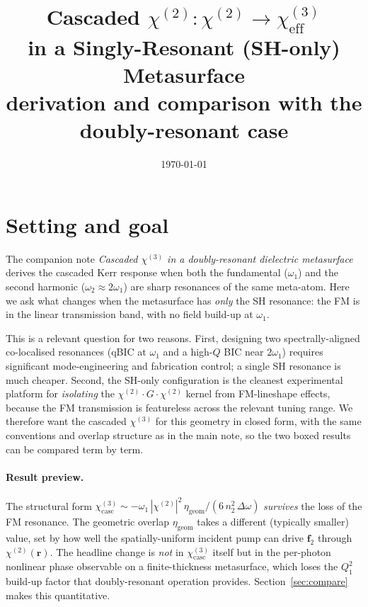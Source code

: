 \documentclass[11pt,a4paper]{article}
\newcommand{\bvec}[1]{\mathbf{#1}}
\newcommand{\f}{\bvec{f}}
\newcommand{\ri}{\bvec{r}}
\newcommand{\chitwo}{\chi^{(2)}}
\newcommand{\chithree}{\chi^{(3)}}
\newcommand{\Dom}{\Delta\omega}
\begin{document}
\title{Cascaded $\chi^{(2)}{:}\chi^{(2)} \to \chi^{(3)}_\text{eff}$\\
       in a Singly-Resonant (SH-only) Metasurface \\[2pt]
       \large derivation and comparison with the doubly-resonant case}
\author{}
\date{\today}
\maketitle

\section{Setting and goal}\label{sec:setting}

The companion note \emph{Cascaded $\chithree$ in a doubly-resonant dielectric
metasurface} derives the cascaded Kerr response when both the fundamental
($\omega_1$) and the second harmonic ($\omega_2\approx 2\omega_1$) are
sharp resonances of the same meta-atom.  Here we ask what changes when the
metasurface has \emph{only} the SH resonance: the FM is in the linear
transmission band, with no field build-up at $\omega_1$.

This is a relevant question for two reasons.  First, designing two
spectrally-aligned co-localised resonances (qBIC at $\omega_1$ and a high-$Q$
BIC near $2\omega_1$) requires significant mode-engineering and fabrication
control; a single SH resonance is much cheaper.  Second, the SH-only
configuration is the cleanest experimental platform for \emph{isolating}
the $\chitwo\!\cdot\!G\!\cdot\!\chitwo$ kernel from FM-lineshape effects,
because the FM transmission is featureless across the relevant tuning
range.  We therefore want the cascaded $\chithree$ for this geometry in
closed form, with the same conventions and overlap structure as in the main
note, so the two boxed results can be compared term by term.

\paragraph{Result preview.}
The structural form
$\chithree_{\text{casc}}\sim -\omega_1\,|\chitwo|^{2}\,\eta_\text{geom}/(6\,n_2^{2}\,\Dom)$
\emph{survives} the loss of the FM resonance.  The geometric overlap
$\eta_\text{geom}$ takes a different (typically smaller) value, set by how
well the spatially-uniform incident pump can drive $\f_2$ through
$\chitwo(\ri)$.  The headline change is \emph{not} in $\chithree_\text{casc}$
itself but in the per-photon nonlinear phase observable on a finite-thickness
metasurface, which loses the $Q_1^{2}$ build-up factor that doubly-resonant
operation provides.  Section~\ref{sec:compare} makes this quantitative.
\end{document}
